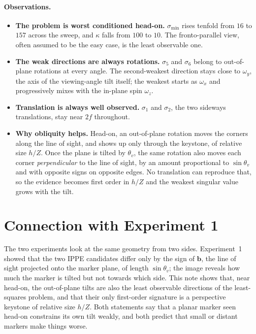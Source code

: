 \documentclass[11pt,a4paper]{article}
\theoremstyle{remark}
\newcommand{\bvec}{\mathbf{b}}
\begin{document}
\paragraph{Observations.}
\begin{itemize}[leftmargin=*]
  \item \textbf{The problem is worst conditioned head-on.} $\sigma_{\min}$
        rises tenfold from $16$ to $157$ across the sweep, and $\kappa$ falls
        from $100$ to $10$. The fronto-parallel view, often assumed to be the
        easy case, is the least observable one.
  \item \textbf{The weak directions are always rotations.} $\sigma_5$ and
        $\sigma_6$ belong to out-of-plane rotations at every angle. The
        second-weakest direction stays close to $\omega_y$, the axis of the
        viewing-angle tilt itself; the weakest starts as $\omega_x$ and
        progressively mixes with the in-plane spin $\omega_z$.
  \item \textbf{Translation is always well observed.} $\sigma_1$ and $\sigma_2$,
        the two sideways translations, stay near $2f$ throughout.
  \item \textbf{Why obliquity helps.} Head-on, an out-of-plane rotation moves
        the corners along the line of sight, and shows up only through the
        keystone, of relative size $h/Z$. Once the plane is tilted by
        $\theta_v$, the same rotation also moves each corner
        \emph{perpendicular} to the line of sight, by an amount proportional to
        $\sin\theta_v$ and with opposite signs on opposite edges. No translation
        can reproduce that, so the evidence becomes first order in $h/Z$ and
        the weakest singular value grows with the tilt.
\end{itemize}

\section{Connection with Experiment 1}
\label{sec:link}

The two experiments look at the same geometry from two sides. Experiment~1
showed that the two IPPE candidates differ only by the sign of $\bvec$, the line
of sight projected onto the marker plane, of length $\sin\theta_v$; the image
reveals how much the marker is tilted but not towards which side. This note
shows that, near head-on, the out-of-plane tilts are also the least observable
directions of the least-squares problem, and that their only first-order
signature is a perspective keystone of relative size $h/Z$. Both statements say
that a planar marker seen head-on constrains its own tilt weakly, and both
predict that small or distant markers make things worse.
\end{document}
